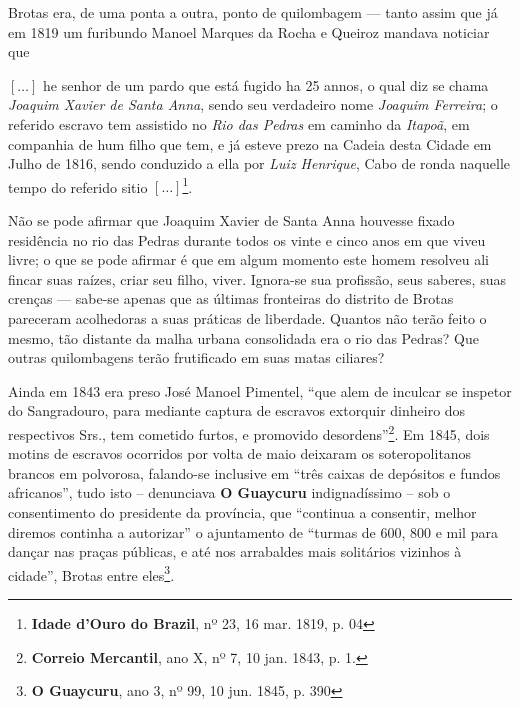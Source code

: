 Brotas era, de uma ponta a outra, ponto de quilombagem --- tanto assim que já em 1819 um furibundo Manoel Marques da Rocha e Queiroz mandava noticiar que

\begin{citacao}
\([\dots]\) he senhor de um pardo que está fugido ha 25 annos, o qual diz se chama \textit{Joaquim Xavier de Santa Anna}, sendo seu verdadeiro nome \textit{Joaquim Ferreira}; o referido escravo tem assistido no \textit{Rio das Pedras} em caminho da \textit{Itapoã}, em companhia de hum filho que tem, e já esteve prezo na Cadeia desta Cidade em Julho de 1816, sendo conduzido a ella por \textit{Luiz Henrique}, Cabo de ronda naquelle tempo do referido sitio \([\dots]\)\footnote{\textbf{Idade d'Ouro do Brazil}, nº 23, 16 mar. 1819, p. 04}.
\end{citacao}

Não se pode afirmar que Joaquim Xavier de Santa Anna houvesse fixado residência no rio das Pedras durante todos os vinte e cinco anos em que viveu livre; o que se pode afirmar é que em algum momento este homem resolveu ali fincar suas raízes, criar seu filho, viver. Ignora-se sua profissão, seus saberes, suas crenças --- sabe-se apenas que as últimas fronteiras do distrito de Brotas pareceram acolhedoras a suas práticas de liberdade. Quantos não terão feito o mesmo, tão distante da malha urbana consolidada era o rio das Pedras? Que outras quilombagens terão frutificado em suas matas ciliares?

Ainda em 1843 era preso José Manoel Pimentel, ``que alem de inculcar se inspetor do Sangradouro, para mediante captura de escravos extorquir dinheiro dos respectivos Srs., tem cometido furtos, e promovido desordens''\footnote{\textbf{Correio Mercantil}, ano X, nº 7, 10 jan. 1843, p. 1.}. Em 1845, dois motins de escravos ocorridos por volta de maio deixaram os soteropolitanos brancos em polvorosa, falando-se inclusive em ``três caixas de depósitos e fundos africanos'', tudo isto -- denunciava \textbf{O Guaycuru} indignadíssimo -- sob o consentimento do presidente da província, que ``continua a consentir, melhor diremos continha a autorizar'' o ajuntamento de ``turmas de  600, 800 e mil para dançar nas praças públicas, e até nos arrabaldes mais solitários vizinhos à cidade'', Brotas entre eles\footnote{\textbf{O Guaycuru}, ano 3, nº 99, 10 jun. 1845, p. 390}.

